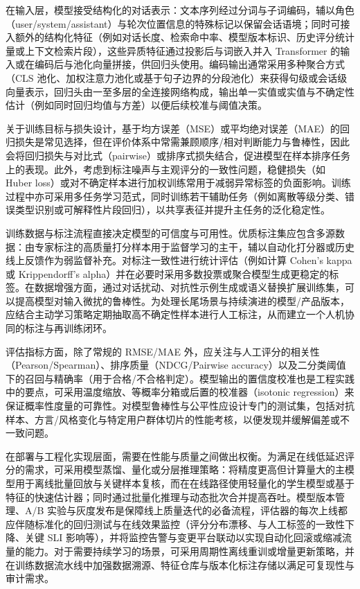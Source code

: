 在输入层，模型接受结构化的对话表示：文本序列经过分词与子词编码，辅以角色（user/system/assistant）与轮次位置信息的特殊标记以保留会话语境；同时可接入额外的结构化特征（例如对话长度、检索命中率、模型版本标识、历史评分统计量或上下文检索片段），这些异质特征通过投影后与词嵌入并入 Transformer 的输入或在编码后与池化向量拼接，供回归头使用。编码输出通常采用多种聚合方式（CLS 池化、加权注意力池化或基于句子边界的分段池化）来获得句级或会话级向量表示，回归头由一至多层的全连接网络构成，输出单一实值或实值与不确定性估计（例如同时回归均值与方差）以便后续校准与阈值决策。

关于训练目标与损失设计，基于均方误差（MSE）或平均绝对误差（MAE）的回归损失是常见选择，但在评价体系中常需兼顾顺序/相对判断能力与鲁棒性，因此会将回归损失与对比式（pairwise）或排序式损失结合，促进模型在样本排序任务上的表现。此外，考虑到标注噪声与主观评分的一致性问题，稳健损失（如 Huber loss）或对不确定样本进行加权训练常用于减弱异常标签的负面影响。训练过程中亦可采用多任务学习范式，同时训练若干辅助任务（例如离散等级分类、错误类型识别或可解释性片段回归），以共享表征并提升主任务的泛化稳定性。

训练数据与标注流程直接决定模型的可信度与可用性。优质标注集应包含多源数据：由专家标注的高质量打分样本用于监督学习的主干，辅以自动化打分器或历史线上反馈作为弱监督补充。对标注一致性进行统计评估（例如计算 Cohen's kappa 或 Krippendorff’s alpha）并在必要时采用多数投票或聚合模型生成更稳定的标签。在数据增强方面，通过对话扰动、对抗性示例生成或语义替换扩展训练集，可以提高模型对输入微扰的鲁棒性。为处理长尾场景与持续演进的模型/产品版本，应结合主动学习策略定期抽取高不确定性样本进行人工标注，从而建立一个人机协同的标注与再训练闭环\cite{Muangkammuen2022ExploitingLA}。

评估指标方面，除了常规的 RMSE/MAE 外，应关注与人工评分的相关性（Pearson/Spearman）、排序质量（NDCG/Pairwise accuracy）以及二分类阈值下的召回与精确率（用于合格/不合格判定）。模型输出的置信度校准也是工程实践中的要点，可采用温度缩放、等概率分箱或后置的校准器（isotonic regression）来保证概率性度量的可靠性。对模型鲁棒性与公平性应设计专门的测试集，包括对抗样本、方言/风格变化与特定用户群体切片的性能考核，以便发现并缓解偏差或不一致问题\cite{conforto-lopez-etal-2026-automatic}。

在部署与工程化实现层面，需要在性能与质量之间做出权衡。为满足在线低延迟评分的需求，可采用模型蒸馏、量化或分层推理策略：将精度更高但计算量大的主模型用于离线批量回放与关键样本复核，而在在线路径使用轻量化的学生模型或基于特征的快速估计器；同时通过批量化推理与动态批次合并提高吞吐。模型版本管理、A/B 实验与灰度发布是保障线上质量迭代的必备流程，评估器的每次上线都应伴随标准化的回归测试与在线效果监控（评分分布漂移、与人工标签的一致性下降、关键 SLI 影响等），并将监控告警与变更平台联动以实现自动化回滚或缩减流量的能力。对于需要持续学习的场景，可采用周期性离线重训或增量更新策略，并在训练数据流水线中加强数据溯源、特征仓库与版本化标注存储以满足可复现性与审计需求。

